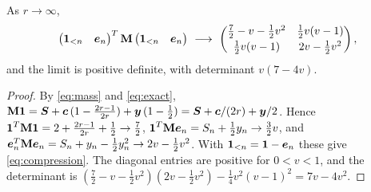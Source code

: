 \begin{lemma}\label{lem:compression}
As \(r\to\infty\),
\begin{equation}\label{eq:compression}
 \begin{pmatrix}\boldsymbol 1_{<n}&\boldsymbol e_n\end{pmatrix}^{T}\mathbf M\begin{pmatrix}\boldsymbol 1_{<n}&\boldsymbol e_n\end{pmatrix}
 \ \longrightarrow\
 \begin{pmatrix}
 \tfrac72-v-\tfrac12v^2&\tfrac12v(v-1)\\[2pt] \tfrac12v(v-1)&2v-\tfrac12v^2
 \end{pmatrix},
\end{equation}
and the limit is positive definite, with determinant \(v(7-4v)\).
\end{lemma}
\begin{proof}
By \eqref{eq:mass} and \eqref{eq:exact},
\(\mathbf M\boldsymbol 1=\boldsymbol S+\boldsymbol c\,(1-\tfrac{2r-1}{2r})+\boldsymbol y\,(1-\tfrac12)=\boldsymbol S+\boldsymbol c/(2r)+\boldsymbol y/2\). Hence
\(\boldsymbol 1^{T}\mathbf M\boldsymbol 1=2+\tfrac{2r-1}{2r}+\tfrac12\to\tfrac72\),
\(\boldsymbol 1^{T}\mathbf M\boldsymbol e_n=S_n+\tfrac12y_n\to\tfrac32v\), and
\(\boldsymbol e_n^{T}\mathbf M\boldsymbol e_n=S_n+y_n-\tfrac12y_n^2\to2v-\tfrac12v^2\). With \(\boldsymbol 1_{<n}=\boldsymbol 1-\boldsymbol e_n\)
these give \eqref{eq:compression}. The diagonal entries are positive for \(0<v<1\), and the
determinant is
\((\tfrac72-v-\tfrac12v^2)(2v-\tfrac12v^2)-\tfrac14v^2(v-1)^2=7v-4v^2\).
\end{proof}

